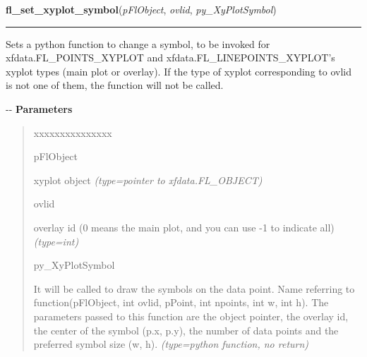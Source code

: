     \label{xformslib:flxyplot:fl_set_xyplot_symbol}

    \vspace{0.5ex}

\hspace{.8\funcindent}\begin{boxedminipage}{\funcwidth}

    \raggedright \textbf{fl\_set\_xyplot\_symbol}(\textit{pFlObject}, \textit{ovlid}, \textit{py\_XyPlotSymbol})

    \vspace{-1.5ex}

    \rule{\textwidth}{0.5\fboxrule}
\setlength{\parskip}{2ex}

Sets a python function to change a symbol, to be invoked for
xfdata.FL\_POINTS\_XYPLOT and xfdata.FL\_LINEPOINTS\_XYPLOT's xyplot types
(main plot or overlay). If the type of xyplot corresponding to ovlid is
not one of them, the function will not be called.

-{}-
\setlength{\parskip}{1ex}
      \textbf{Parameters}
      \vspace{-1ex}

      \begin{quote}
        \begin{Ventry}{xxxxxxxxxxxxxxx}

          \item[pFlObject]


xyplot object
            {\it (type=pointer to xfdata.FL\_OBJECT)}

          \item[ovlid]


overlay id (0 means the main plot, and you can use -1 to indicate all)
            {\it (type=int)}

          \item[py\_XyPlotSymbol]


It will be called to draw the symbols on the data point.
Name referring to function(pFlObject, int ovlid, pPoint, int npoints,
int w, int h). The parameters passed to this function are the object
pointer, the overlay id, the center of the symbol (p.x, p.y), the
number of data points and the preferred symbol size (w, h).
            {\it (type=python function, no return)}

        \end{Ventry}


\end{quote}
\end{boxedminipage}
